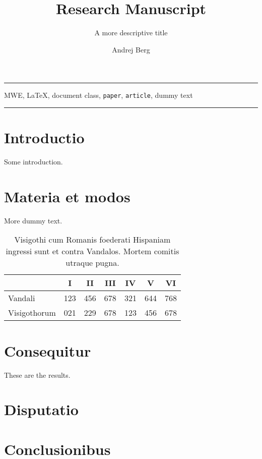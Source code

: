 \documentclass[a4paper]{paper}
\title{Research Manuscript}
\subtitle{A more descriptive title}
\author{Andrej Berg}
\begin{document}
	
	\maketitle 
	\hrule 
	\smalltableofcontents
	\begin{abstract} {\lipsum[12]} \end{abstract}
	\begin{keywords}
		MWE, \LaTeX, document class, \texttt{paper},
		\texttt{article}, dummy text    
	\end{keywords}
	\hrule\bigskip
	

\section{Introductio} 
Some introduction. \lipsum[2]
\section{Materia et modos} 
More dummy text. \lipsum[4] 


\begin{table}[b]
	\centering
	\begin{tabular}{lcccccc}
		\toprule
		& I &  II & III & IV & V & VI \\
		\midrule
		Vandali     & 123 & 456 & 678 & 321 & 644 & 768  \\ 
		Visigothorum & 021 & 229 & 678 & 123 & 456 & 678 \\     
		\bottomrule
	\end{tabular}
	\caption{Visigothi cum Romanis foederati Hispaniam ingressi sunt et contra Vandalos. Mortem comitis utraque pugna.} 
\end{table}

\section{Consequitur} 
These are the results. \lipsum[1]
\section{Disputatio} 
\lipsum[4] 
\section{Conclusionibus}
\lipsum[5]
\end{document}
